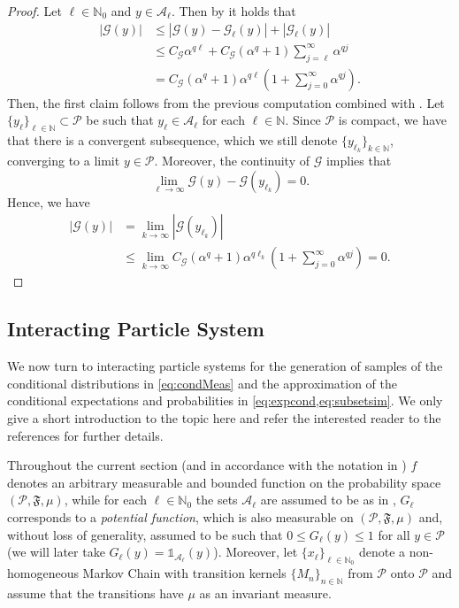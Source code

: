 \documentclass{article}
\newcommand{\cA}{\mathcal{A}}
\newcommand{\cG}{\mathcal{G}}
\newcommand{\cP}{\mathcal{P}}
\newcommand{\fF}{\mathfrak{F}}
\newcommand{\IN}{\mathbb{N}}
\newcommand{\bOne}{\mathds{1}}
\newcommand{\abs}[1]{{\left\vert #1 \right\vert}}
\newcommand{\probspace}{\cP, \fF, \mu}
\theoremstyle{definition}
\begin{document}
\begin{proof}
  Let $\ell\in\IN_0$ and $y\in\cA_\ell$. Then by  it holds that
  \begin{align*}
    \abs{\cG(y)}&\leq\abs{\cG(y)-\cG_\ell(y)}+\abs{\cG_\ell(y)}\\
                &\leq C_\cG\alpha^{q\ell} + C_\cG(\alpha^q+1)\sum\limits_{j=\ell}^{\infty}\alpha^{q j}\\
                &=C_{\cG}(\alpha^q+1)\alpha^{q\ell}\left(1+\sum\limits_{j=0}^\infty\alpha^{qj}\right).
  \end{align*}
  Then, the first claim follows from the previous computation combined with .
  Let $\{y_\ell\}_{\ell\in\IN}\subset\cP$ be such that $y_\ell\in\cA_\ell$ for each $\ell\in\IN$. Since $\cP$ is compact, we have that
  there is a convergent subsequence, which we still denote $\{y_{\ell_k}\}_{k\in\IN}$, converging to a limit $y\in\cP$. Moreover, the
  continuity of $\cG$ implies that
  $$\lim\limits_{\ell\to\infty}\cG(y)-\cG(y_{\ell_k})= 0.$$
  Hence, we have
  \begin{align*}
    \abs{\cG(y)} &= \lim\limits_{k\to\infty}\abs{\cG(y_{\ell_k})}\\
                 & \leq \lim\limits_{k\to\infty}C_{\cG}(\alpha^q+1)\alpha^{q\ell_k}\left(1+\sum\limits_{j=0}^\infty\alpha^{qj}\right)=0.
  \end{align*}
\end{proof}

\subsection{Interacting Particle System}
\label{ssec:IPS}
We now turn to interacting particle systems for the generation of samples of the conditional distributions
in \cref{eq:condMeas} and the approximation of the conditional expectations and probabilities in
\cref{eq:expcond,eq:subsetsim}.
We only give a short introduction to the topic here and refer the interested reader to the references
\cite{cerouSequentialMonteCarlo2012,cerouNonasymptoticTheoremUnnormalized2011,DelMoralFeynmanKac2004,delmoralGenealogicalParticleAnalysis2005}
for further details.
 
Throughout the current section (and in accordance with the notation in
\cite{cerouSequentialMonteCarlo2012,DelMoralFeynmanKac2004}) $f$ denotes
an arbitrary measurable and bounded function on the probability space $(\probspace)$, while for each $\ell\in\IN_0$ the sets $\cA_\ell$ are assumed to be as in ,
$G_\ell$ corresponds to a \emph{potential function}, which is also measurable on $(\probspace)$ and, without loss of generality,
assumed to be such that $0\leq G_\ell(y)\leq 1$ for all $y\in\cP$ (we will later  take $G_\ell(y)=\bOne_{\cA_{\ell}}(y)$). Moreover, let $\{x_\ell\}_{\ell\in\IN_0}$ denote a non-homogeneous
Markov Chain with transition kernels $\{{M}_{n}\}_{n\in\IN}$ from $\cP$ onto $\cP$ and assume that the transitions have $\mu$ as an invariant measure.
\end{document}
